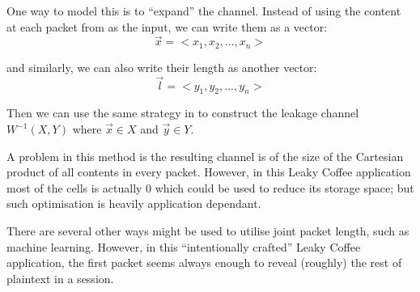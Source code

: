 One way to model this is to “expand” the channel. Instead of using the content at each packet from as the input, we can write them as a vector:
\begin{equation*}
\vec{x} = <x_1, x_2, ..., x_n>
\end{equation*}

and similarly, we can also write their length as another vector:
\begin{equation*}
\vec{l} = <y_1, y_2, ..., y_n>
\end{equation*}

Then we can use the same strategy in  to construct the leakage channel $W^{-1}(X, Y)$ where $\vec{x} \in X$ and $\vec{y} \in Y$. 

A problem in this method is the resulting channel is of the size of the Cartesian product of all contents in every packet. However, in this Leaky Coffee application most of the cells is actually $0$ which could be used to reduce its storage space; but such optimisation is heavily application dependant.

There are several other ways might be used to utilise joint packet length, such as machine learning. However, in this “intentionally crafted” Leaky Coffee application, the first packet seems always enough to reveal (roughly) the rest of plaintext in a session.


